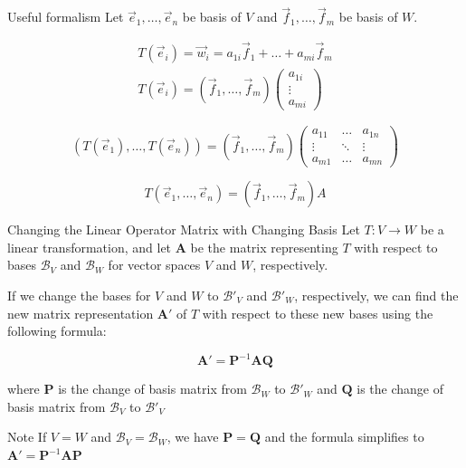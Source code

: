 \documentclass[fullscreen=true, bookmarks=true, hyperref={pdfencoding=unicode}]{beamer}
\begin{document}
\begin{frame}{Useful formalism}
  Let $\vec{e}_1, \dots, \vec{e}_n$ be basis of $V$ 
  and $\vec{f}_1, \dots, \vec{f}_m$ be basis of $W$.
  
  \begin{align*}
    T(\vec{e}_i) = \vec{w}_i = a_{1i}\vec{f}_1 + \dots + a_{mi}\vec{f}_m \\
    T(\vec{e}_i) = (\vec{f}_1, \dots, \vec{f}_m)
    \begin{pmatrix}
      a_{1i} \\ \vdots \\ a_{mi}
    \end{pmatrix}
  \end{align*}
  
  \pause
  $$(T(\vec{e}_1), \dots, T(\vec{e}_n)) = (\vec{f}_1, \dots, \vec{f}_m)
  \begin{pmatrix}
    a_{11} & \dots & a_{1n} \\
    \vdots & \ddots& \vdots \\ 
    a_{m1} & \dots & a_{mn}
  \end{pmatrix}$$

  \pause
  $$\boxed{T(\vec{e}_1, \dots, \vec{e}_n) = (\vec{f}_1, \dots, \vec{f}_m)A}$$
\end{frame}


\begin{frame}{Changing the Linear Operator Matrix with Changing Basis}
  Let $T: V \rightarrow W$ be a linear transformation, and let $\mathbf{A}$ be the matrix representing $T$ with respect to bases $\mathcal{B}_V$ and $\mathcal{B}_W$ for vector spaces $V$ and $W$, respectively. 
  
  \pause
  If we change the bases for $V$ and $W$ to $\mathcal{B}'_V$ and $\mathcal{B}'_W$, respectively, we can find the new matrix representation $\mathbf{A}'$ of $T$ with respect to these new bases using the following formula:
  
  \[
  \mathbf{A}' = \mathbf{P}^{-1} \mathbf{A} \mathbf{Q}
  \]
  
  where $\mathbf{P}$ is the change of basis matrix from $\mathcal{B}_W$ to $\mathcal{B}'_W$ and $\mathbf{Q}$ is the change of basis matrix from $\mathcal{B}_V$ to $\mathcal{B}'_V$
  
  \pause
  \begin{block}{Note}
  If $V=W$ and $\mathcal{B}_V = \mathcal{B}_W$, 
  we have $\mathbf{P} = \mathbf{Q}$ and the formula 
  simplifies to $\mathbf{A}' = \mathbf{P}^{-1} \mathbf{A} \mathbf{P}$
  \end{block}
  
\end{frame}
\end{document}
